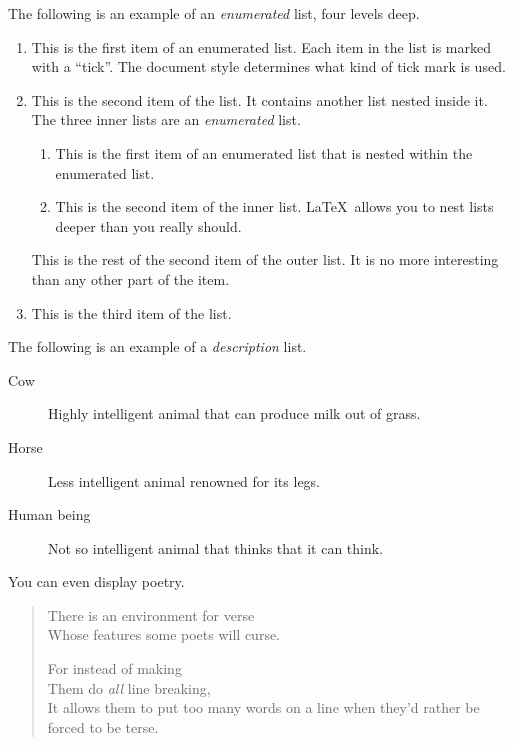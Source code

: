 \documentclass[ss]{imsart}
\numberwithin{equation}{section}
\theoremstyle{plain}
\begin{document}
The following is an example of an {\em enumerated} list, four levels deep.
\begin{enumerate}
\item  This is the first item of an enumerated list.  Each item
      in the list is marked with a ``tick''.  The document
      style determines what kind of tick mark is used.
\item  This is the second item of the list.  It contains another
      list nested inside it.  The three inner lists are an {\em enumerated}
      list.
    \begin{enumerate}
       \item This is the first item of an enumerated list that
            is nested within the enumerated list.
          \item This is the second item of the inner list.  \LaTeX\
            allows you to nest lists deeper than you really should.
      \end{enumerate}
      This is the rest of the second item of the outer list.  It
      is no more interesting than any other part of the item.
   \item  This is the third item of the list.
\end{enumerate}

The following is an example of a {\em description} list.
\begin{description}
\item[Cow] Highly intelligent animal that can produce milk out of grass.
\item[Horse] Less intelligent animal renowned for its legs.
\item[Human being] Not so intelligent animal that thinks that it can think.
\end{description}

You can even display poetry.
\begin{verse}
   There is an environment for verse \\    %
   Whose features some poets will curse.   %


   For instead of making\\
   Them do {\em all\/} line breaking, \\
   It allows them to put too many words on a line when they'd
   rather be forced to be terse.
\end{verse}
\end{document}
